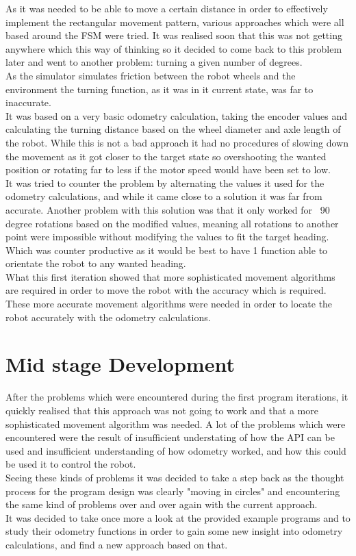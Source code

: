 As it was needed to be able to move a certain distance in order to effectively implement the rectangular movement pattern, various approaches which were all based around the FSM were tried.
It was realised soon that this was not getting anywhere which this way of thinking so it decided to come back to this problem later and went to another problem: turning a given number of degrees. \\
As the simulator simulates friction between the robot wheels and the environment the turning function, as it was in it current state, was far to inaccurate. \\
It was based on a very basic odometry calculation, taking the encoder values and calculating the turning distance based on the wheel diameter and axle length of the robot. While this is not a bad approach it had no procedures of slowing down the movement as it got closer to the target state so overshooting the wanted position or rotating far to less if the motor speed would have been set to low. \\
It was tried to counter the problem by alternating the values it used for the odometry calculations, and while it came close to a solution it was far from accurate. Another problem with this solution was that it only worked for ~90 degree rotations based on the modified values, meaning all rotations to another point were impossible without modifying the values to fit the target heading. Which was counter productive as it would be best to have 1 function able to orientate the robot to any wanted heading. \\[3ex]

What this first iteration showed that more sophisticated movement algorithms are required in order to move the robot with the accuracy which is required. These more accurate movement algorithms were needed in order to locate the robot accurately with the odometry calculations. 

\section{Mid stage Development}
After the problems which were encountered during the first program iterations, it quickly realised that this approach was not going to work and that a more sophisticated movement algorithm was needed. A lot of the problems which were encountered were the result of insufficient understating of how the API can be used and insufficient understanding of how odometry worked, and how this could be used it to control the robot.\\
Seeing these kinds of problems it was decided to take a step back as the thought process for the program design was clearly "moving in circles" and encountering the same kind of problems over and over again with the current approach. \\
It was decided to take once more a look at the provided example programs and to study their odometry functions in order to gain some new insight into odometry calculations, and find a new approach based on that.

